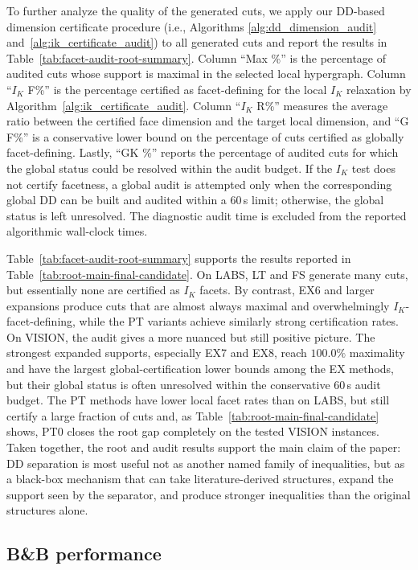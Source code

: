 To further analyze the quality of the generated cuts, we apply our DD-based dimension certificate procedure (i.e., Algorithms \ref{alg:dd_dimension_audit} and~\ref{alg:ik_certificate_audit}) to all generated cuts and report the results in Table~\ref{tab:facet-audit-root-summary}. Column ``Max \%'' is the percentage of audited cuts whose support is maximal in the selected local hypergraph. Column ``$I_K$ F\%'' is the percentage certified as facet-defining for the local $I_K$ relaxation by Algorithm~\ref{alg:ik_certificate_audit}. Column ``$I_K$ R\%'' measures the average ratio between the certified face dimension and the target local dimension, and ``G F\%'' is a conservative lower bound on the percentage of cuts certified as globally facet-defining. Lastly, ``GK \%'' reports the percentage of audited cuts for which the global status could be resolved within the audit budget. If the $I_K$ test does not certify facetness, a global audit is attempted only when the corresponding global DD can be built and audited within a 60\,s limit; otherwise, the global status is left unresolved. The diagnostic audit time is excluded from the reported algorithmic wall-clock times.


Table~\ref{tab:facet-audit-root-summary}  supports the results reported in Table~\ref{tab:root-main-final-candidate}. On LABS, LT and FS generate many cuts, but essentially none are certified as $I_K$ facets. By contrast, EX6 and larger expansions produce cuts that are almost always maximal and overwhelmingly $I_K$-facet-defining, while the PT variants achieve similarly strong certification rates. On VISION, the audit gives a more nuanced but still positive picture. The strongest expanded supports, especially EX7 and EX8, reach $100.0\%$ maximality and have the largest global-certification lower bounds among the EX methods, but their global status is often unresolved within the conservative 60\,s audit budget. The PT methods have lower local facet rates than on LABS, but still certify a large fraction of cuts and, as Table~\ref{tab:root-main-final-candidate} shows, PT0 closes the root gap completely on the tested VISION instances. Taken together, the root and audit results support the main claim of the paper: DD separation is most useful not as another named family of inequalities, but as a black-box mechanism that can take literature-derived structures, expand the support seen by the separator, and produce stronger inequalities than the original structures alone.


\subsection{B\&B performance}

